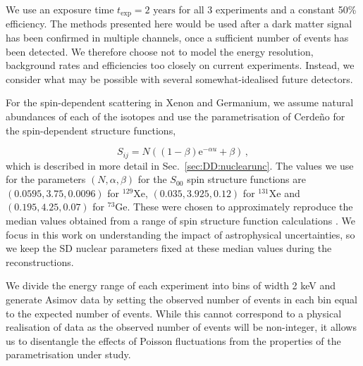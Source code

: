 We use an exposure time $t_\textrm{exp} = 2 \textrm{ years}$ for all 3 experiments and a constant 50\% efficiency. The methods presented here would be used after a dark matter signal has been confirmed in multiple channels, once a sufficient number of events has been detected. We therefore choose not to model the energy resolution, background rates and efficiencies too closely on current experiments. Instead, we consider what may be possible with several somewhat-idealised future detectors.

For the spin-dependent scattering in Xenon and Germanium, we assume natural abundances of each of the isotopes and use the parametrisation of Cerde\~{n}o \etal \cite{Cerdeno:2012} for the spin-dependent structure functions,

\begin{equation}
\label{eq:NT:SDparametrization}
S_{ij} = N ((1-\beta)\mathrm{e}^{-\alpha u} + \beta)\,,
\end{equation}
which is described in more detail in Sec.~\ref{sec:DD:nuclearunc}. The values we use 
for the parameters $(N, \alpha, \beta)$ for the $S_{00}$ spin structure functions are $(0.0595, 3.75, 0.0096)$ for $^{129}$Xe, 
$(0.035, 3.925, 0.12)$ for $^{131}$Xe and $(0.195, 4.25, 0.07)$ for $^{73}$Ge. These 
were chosen to approximately reproduce the median values obtained from a range 
of spin structure function calculations \cite{Ressel:1993,Dimitrov:1995,Ressell:1997,Menendez:2012}. We focus in this work on understanding the impact of astrophysical uncertainties, so we keep the SD nuclear parameters fixed at these median values during the reconstructions.

We divide the energy range of each experiment into bins of width 2 keV and generate Asimov data \cite{Cowan:2013} by setting the observed number of events in each bin equal to the expected number of events. While this cannot correspond to a physical realisation of data as the observed number of events will be non-integer, it allows us to disentangle the effects of Poisson fluctuations from the properties of the parametrisation under study.

